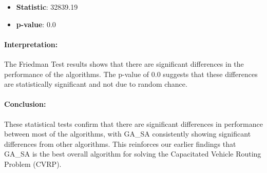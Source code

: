 \documentclass[
]{article}
\begin{document}
    \begin{itemize}
        \item \textbf{Statistic}: 32839.19
        \item \textbf{p-value}: 0.0
    \end{itemize}

    \paragraph{Interpretation:}
    The Friedman Test results shows that there are significant differences in the performance of the algorithms.
    The p-value of 0.0 suggests that these differences are statistically significant and not due to random chance.

    \paragraph{Conclusion:}
    These statistical tests confirm that there are significant differences in performance between most of the algorithms, with GA\_SA consistently showing significant differences from other algorithms.
    This reinforces our earlier findings that GA\_SA is the best overall algorithm for solving the Capacitated Vehicle Routing Problem (CVRP).






    \newpage

%

\end{document}
